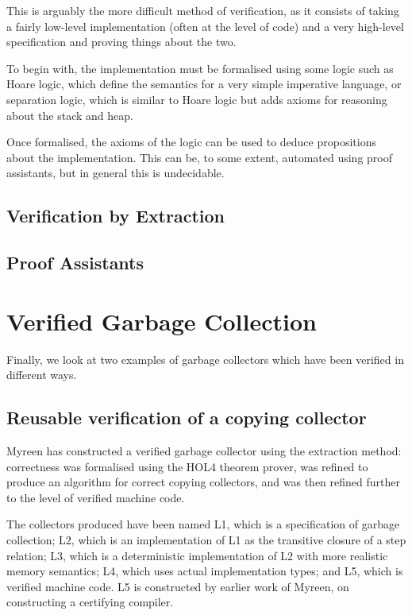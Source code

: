 This is arguably the more difficult method of verification, as it
consists of taking a fairly low-level implementation (often at the
level of code) and a very high-level specification and proving things
about the two.

To begin with, the implementation must be formalised using some logic
such as Hoare logic\cite{Hoare69}, which define the semantics for a
very simple imperative language, or separation logic\cite{Reynolds02},
which is similar to Hoare logic but adds axioms for reasoning about
the stack and heap.

Once formalised, the axioms of the logic can be used to deduce
propositions about the implementation. This can be, to some extent,
automated using proof assistants, but in general this is undecidable.

\subsection{Verification by Extraction}


\subsection{Proof Assistants}


\section{Verified Garbage Collection}

Finally, we look at two examples of garbage collectors which have been
verified in different ways.

\subsection{Reusable verification of a copying collector}

Myreen\cite{Myreen10} has constructed a verified garbage collector
using the extraction method: correctness was formalised using the HOL4
theorem prover, was refined to produce an algorithm for correct
copying collectors, and was then refined further to the level of
verified machine code.

The collectors produced have been named L1, which is a specification
of garbage collection; L2, which is an implementation of L1 as the
transitive closure of a step relation; L3, which is a deterministic
implementation of L2 with more realistic memory semantics; L4, which
uses actual implementation types; and L5, which is verified machine
code. L5 is constructed by earlier work of Myreen, on constructing a
certifying compiler.

